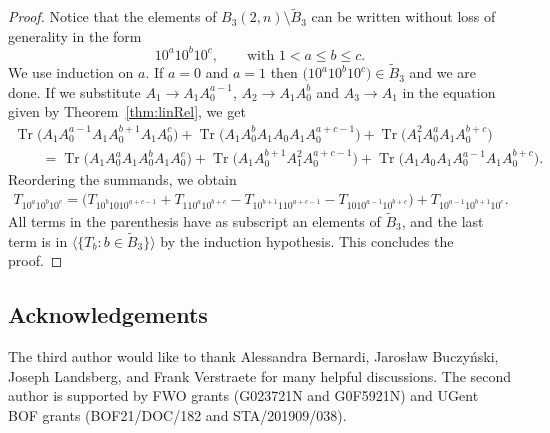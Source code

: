 \documentclass[10pt,a4paper]{amsart}
\numberwithin{equation}{section}
\DeclareMathOperator{\Tr}{Tr}
\begin{document}
\begin{proof}
Notice that the elements of $B_3(2,n)\setminus \tilde{B}_3$ can be written without loss of generality in the form
\[
10^a10^b10^c, \qquad \text{with }1< a\leq b\leq c.
\]
We use induction on $a$. If $a=0$ and $a=1$ then $\big(10^a10^b10^c\big)\in \tilde{B}_3$ and we are done.
If we substitute $A_1 \to A_1A_0^{a-1}$, $A_2 \to A_1A_0^{b}$ and $A_3 \to A_1$
in the equation given by Theorem~\ref{thm:linRel}, we get
\begin{gather*}
\Tr\big(A_1A_0^{a-1} A_1A_0^{b+1} A_1 A_0^c\big) +\Tr\big(A_1A_0^{b} A_1 A_0 A_1A_0^{a+c-1} \big)+ \Tr\big(A_1^2A_0^{a} A_1A_0^{b+c}\big)   \nonumber\\
\qquad{}=\Tr\big(A_1A_0^{a} A_1A_0^{b} A_1 A_0^c\big) + \Tr\big(A_1A_0^{b+1} A_1^2 A_0^{a+c-1} \big) + \Tr\big(A_1 A_0 A_1A_0^{a-1} A_1A_0^{b+c} \big).
\end{gather*}
Reordering the summands, we obtain
\begin{gather*}
T_{10^{a} 10^{b} 1 0^c} = \big(T_{10^{b} 1 0 10^{a+c-1} }+ T_{110^{a} 10^{b+c}} - T_{10^{b+1} 11 0^{a+c-1} } - T_{1 0 10^{a-1} 10^{b+c} }\big)+ T_{10^{a-1} 10^{b+1} 1 0^c}.
\end{gather*}
All terms in the parenthesis have as subscript an elements of $\tilde{B}_3$, and the last term is in $\big\langle\big\{T_b\colon b\in \tilde{B}_3\big\}\big\rangle$ by the induction hypothesis.
This concludes the proof.
\end{proof}

\subsection*{Acknowledgements}
The third author would like to thank Alessandra Bernardi, Jaros{\l}aw Buczy{\'n}ski, Joseph Landsberg, and Frank Verstraete for many helpful discussions. The second author is supported by FWO grants (G023721N and G0F5921N) and UGent BOF grants (BOF21/DOC/182 and STA/201909/038).

\end{document}
